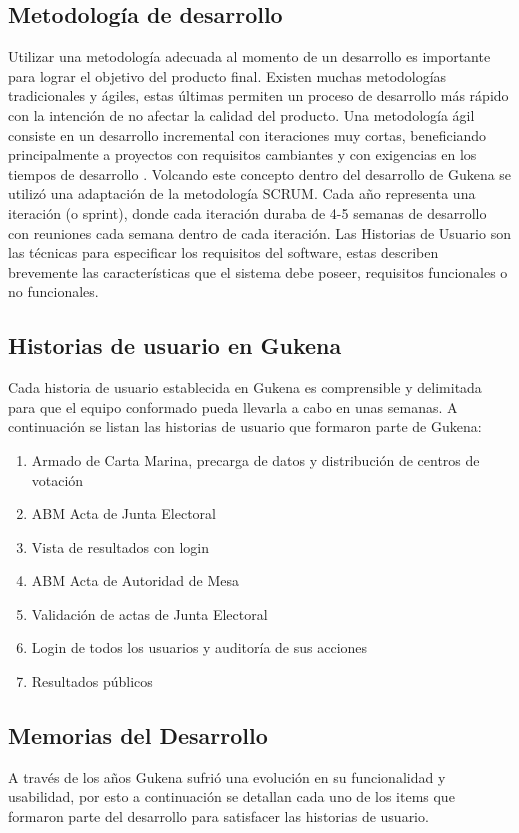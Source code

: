 \subsection{Metodología de desarrollo}
Utilizar una metodología adecuada al momento de un desarrollo es importante para lograr el objetivo del producto final. Existen muchas metodologías tradicionales y ágiles, estas últimas permiten un proceso de desarrollo más rápido con la intención de no afectar la calidad del producto. Una metodología ágil consiste en un desarrollo incremental con iteraciones muy cortas, beneficiando principalmente a proyectos con requisitos cambiantes y con exigencias en los tiempos
de desarrollo \cite{canos2012metodologias}. 
Volcando este concepto dentro del desarrollo de Gukena se utilizó una adaptación de la metodología SCRUM. Cada año representa una iteración (o sprint), donde cada iteración duraba de 4-5 semanas de desarrollo con reuniones cada semana dentro de cada iteración. Las Historias de Usuario son las técnicas para especificar los requisitos del software, estas describen brevemente las características que el sistema debe poseer, requisitos funcionales o no funcionales.
\subsection{Historias de usuario en Gukena}
 Cada historia de usuario establecida en Gukena es comprensible y delimitada para que el equipo conformado pueda llevarla a cabo en unas semanas. A continuación se listan las historias de usuario que formaron parte de Gukena:
 \begin{enumerate}
     \item Armado de Carta Marina, precarga de datos y distribución de centros de votación
     \item ABM Acta de Junta Electoral
     \item Vista de resultados con login
     \item ABM Acta de Autoridad de Mesa
     \item Validación de actas de Junta Electoral
     \item Login de todos los usuarios y auditoría de sus acciones
     \item Resultados públicos
 \end{enumerate}
 
\subsection{Memorias del Desarrollo}
A través de los años Gukena sufrió una evolución en su funcionalidad y usabilidad, por esto a continuación se detallan cada uno de los items que formaron parte del desarrollo para satisfacer las historias de usuario.

